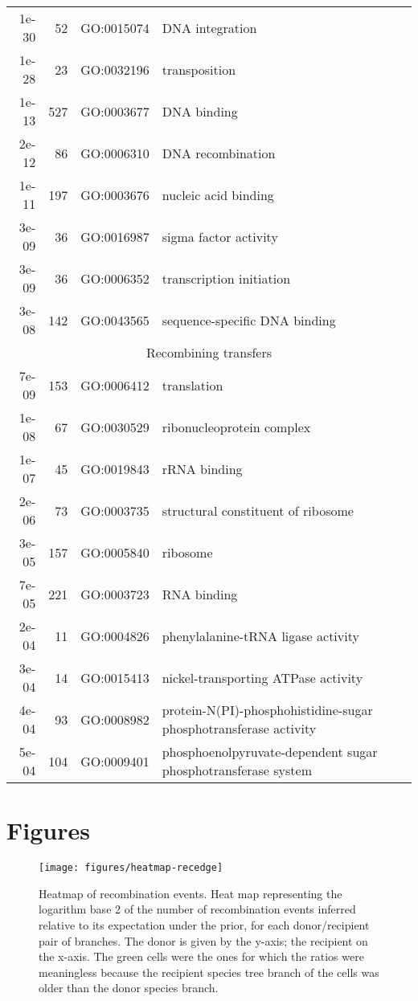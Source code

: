 \documentclass[english]{article}
\begin{document}
\begin{table}
\begin{tabular}{rrll}
1e-30 &  52 & GO:0015074 & DNA integration\\
1e-28 &  23 & GO:0032196 & transposition\\
1e-13 & 527 & GO:0003677 & DNA binding\\
2e-12 &  86 & GO:0006310 & DNA recombination\\
1e-11 & 197 & GO:0003676 & nucleic acid binding\\
3e-09 &  36 & GO:0016987 & sigma factor activity\\
3e-09 &  36 & GO:0006352 & transcription initiation\\
3e-08 & 142 & GO:0043565 & sequence-specific DNA binding\\
\hline
\hline
\multicolumn{4}{c}{Recombining transfers} \\
\hline
7e-09 & 153 & GO:0006412 & translation\\
1e-08 &  67 & GO:0030529 & ribonucleoprotein complex\\
1e-07 &  45 & GO:0019843 & rRNA binding\\
2e-06 &  73 & GO:0003735 & structural constituent of ribosome\\
3e-05 & 157 & GO:0005840 & ribosome\\
7e-05 & 221 & GO:0003723 & RNA binding\\
2e-04 &  11 & GO:0004826 & phenylalanine-tRNA ligase activity\\
3e-04 &  14 & GO:0015413 & nickel-transporting ATPase activity\\
4e-04 &  93 & GO:0008982 & protein-N(PI)-phosphohistidine-sugar phosphotransferase activity\\
5e-04 & 104 & GO:0009401 & phosphoenolpyruvate-dependent sugar phosphotransferase system\\
\end{tabular}

\end{table}



\clearpage{}


\section*{Figures\clearpage{}}

\begin{figure}
\texttt{[image: figures/heatmap-recedge]}
\caption{\label{fig:Heatmap-of-recombination}Heatmap of recombination events.
Heat map representing the logarithm base 2 of the number of recombination
events inferred relative to its expectation under the prior, for each
donor/recipient pair of branches. The donor is given by the y-axis;
the recipient on the x-axis.  The
green cells were the ones for which the ratios were meaningless because
the recipient species tree branch of the cells was older than the
donor species branch.}
\end{figure}
\clearpage{}%
\end{document}
